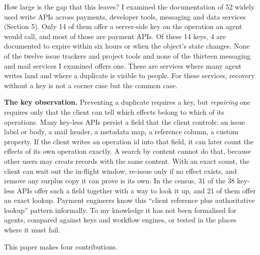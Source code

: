 \documentclass[
  10pt,
]{article}
\begin{document}
How large is the gap that this leaves? I examined the documentation of
52 widely used write APIs across payments, developer tools, messaging
and data services (Section 5). Only 14 of them offer a server-side key
on the operation an agent would call, and most of those are payment
APIs. Of these 14 keys, 4 are documented to expire within six hours or
when the object's state changes. None of the twelve issue trackers and
project tools and none of the thirteen messaging and mail services I
examined offers one. These are services where many agent writes land and
where a duplicate is visible to people. For these services, recovery
without a key is not a corner case but the common case.

\textbf{The key observation.} Preventing a duplicate requires a key, but
\emph{repairing} one requires only that the client can tell which
effects belong to which of its operations. Many key-less APIs persist a
field that the client controls: an issue label or body, a mail header, a
metadata map, a reference column, a custom property. If the client
writes an operation id into that field, it can later count the effects
of its own operation exactly. A search by content cannot do that,
because other users may create records with the same content. With an
exact count, the client can wait out the in-flight window, re-issue only
if no effect exists, and remove any surplus copy it can prove is its
own. In the census, 31 of the 38 key-less APIs offer such a field
together with a way to look it up, and 21 of them offer an exact lookup.
Payment engineers know this ``client reference plus authoritative
lookup'' pattern informally. To my knowledge it has not been formalised
for agents, compared against keys and workflow engines, or tested in the
places where it must fail.

This paper makes four contributions.
\end{document}
